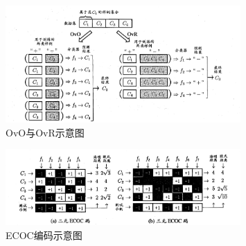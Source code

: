 \documentclass[12pt, a4paper]{article} %
\begin{document}
\begin{figure}[H]
    \centering
    \includegraphics[width=0.8\textwidth]{../img/3-4-OvO与OvR示意图.png}
    \caption{OvO与OvR示意图}
    \label{fig:OvO与OvR示意图}
\end{figure}

\begin{figure}[H]
    \centering
    \includegraphics[width=0.8\textwidth]{../img/3-5-ECOC编码示意图.png}
    \caption{ECOC编码示意图}
    \label{fig:ECOC编码示意图，“$+1, -1$”分别表示学习器 $f_i$ 将该类样本作为正、反例；三元码中“$0$”表示 $f_i$ 不使用该类样本}
\end{figure}
\end{document}

